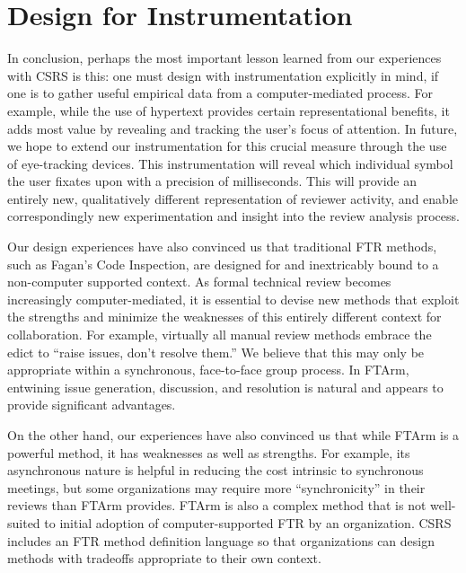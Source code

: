 
\section{Design for Instrumentation}
\label{sec:design}

In conclusion, perhaps the most important lesson learned from our
experiences with CSRS is this: one must design with instrumentation
explicitly in mind, if one is to gather useful empirical data from a
computer-mediated process.  For example, while the use of hypertext
provides certain representational benefits, it adds most value by revealing
and tracking the user's focus of attention.  In future, we hope to extend
our instrumentation for this crucial measure through the use of
eye-tracking devices.  This instrumentation will reveal which individual
symbol the user fixates upon with a precision of milliseconds.  This will
provide an entirely new, qualitatively different representation of reviewer
activity, and enable correspondingly new experimentation and insight into
the review analysis process.

Our design experiences have also convinced us that traditional FTR methods,
such as Fagan's Code Inspection, are designed for and inextricably bound to
a non-computer supported context.  As formal technical review becomes
increasingly computer-mediated, it is essential to devise new methods that
exploit the strengths and minimize the weaknesses of this entirely
different context for collaboration. For example, virtually all manual
review methods embrace the edict to ``raise issues, don't resolve them.''
We believe that this may only be appropriate within a synchronous,
face-to-face group process. In FTArm, entwining
issue generation, discussion, and resolution is natural and appears to
provide significant advantages.

On the other hand, our experiences have also convinced us that while FTArm
is a powerful method, it has weaknesses as well as strengths.  For example,
its asynchronous nature is helpful in reducing the cost intrinsic to
synchronous meetings, but some organizations may require more
``synchronicity'' in their reviews than FTArm provides.  FTArm is also a
complex method that is not well-suited to initial adoption of
computer-supported FTR by an organization.  CSRS includes an FTR method
definition language so that organizations can design methods with tradeoffs
appropriate to their own context.


